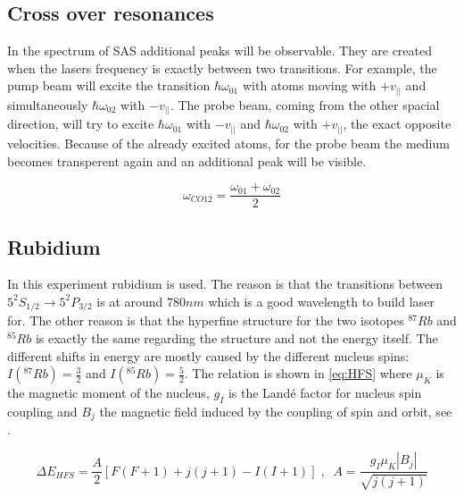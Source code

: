 \documentclass[]{article}
\begin{document}
\subsection{Cross over resonances}
In the spectrum of SAS additional peaks will be observable. They are created when the lasers frequency is exactly between two transitions. For example, the pump beam will excite the transition $\hbar\omega_{01}$ with atoms moving with $+v_{||}$ and simultaneously $\hbar\omega_{02}$ with $-v_{||}$. The probe beam, coming from the other spacial direction, will try to excite $\hbar\omega_{01}$ with $-v_{||}$ and $\hbar\omega_{02}$ with $+v_{||}$, the exact opposite velocities. Because of the already excited atoms, for the probe beam the medium becomes transperent again and an additional peak will be visible.

\begin{equation}
\omega_{CO 12} = \frac{\omega_{01}+\omega_{02}}{2}
\end{equation}

\subsection{Rubidium}
In this experiment rubidium is used. The reason is that the transitions between $5^2S_{1/2} \rightarrow 5^2P_{3/2}$ is at around $780nm$ which is a good wavelength to build laser for. The other reason is that the hyperfine structure for the two isotopes $^{87}Rb$ and $^{85}Rb$ is exactly the same regarding the structure and not the energy itself. The different shifts in energy are mostly caused by the different nucleus spins: $I(^{87}Rb)=\frac{3}{2}$ and $I(^{85}Rb)=\frac{5}{2}$. The relation is shown in \autoref{eq:HFS} where $\mu_K$ is the magnetic moment of the nucleus, $g_I$ is the Landé factor for nucleus spin coupling and $B_j$ the magnetic field induced by the coupling of spin and orbit, see \cite{dem3}.

\begin{equation}
\Delta E_{HFS}=\frac{A}{2} [F(F+1) + j(j+1) - I(I+1)] \;,\;\; A= \frac{g_I \mu_K |B_j|}{\sqrt{j(j+1)}}
\label{eq:HFS}
\end{equation}



\newpage
\end{document}

